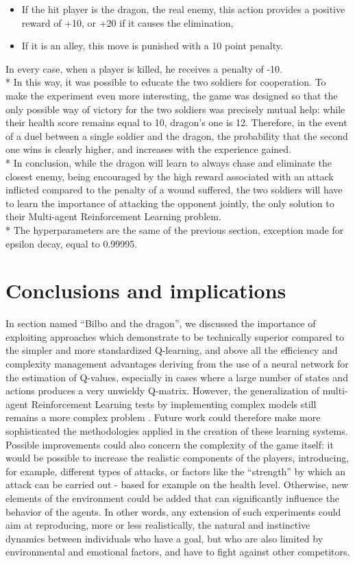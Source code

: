 \begin{itemize}[noitemsep, topsep=0ex]
  \item If the hit player is the dragon, the real enemy, this action provides a positive reward of +10, or +20 if it causes the elimination,
  \item If it is an alley, this move is punished with a 10 point penalty.
\end{itemize}
In every case, when a player is killed, he receives a penalty of -10.\\*
In this way, it was possible to educate the two soldiers for cooperation. To make the experiment even more interesting, the game was designed so that the only possible way of victory for the two soldiers was precisely mutual help: while their health score remains equal to 10, dragon's one is 12. Therefore, in the event of a duel between a single soldier and the dragon, the probability that the second one wins is clearly higher, and increases with the experience gained.\\*
In conclusion, while the dragon will learn to always chase and eliminate the closest enemy, being encouraged by the high reward associated with an attack inflicted compared to the penalty of a wound suffered, the two soldiers will have to learn the importance of attacking the opponent jointly, the only solution to their Multi-agent Reinforcement Learning problem.\\*
The hyperparameters are the same of the previous section, exception made for epsilon decay, equal to 0.99995.

\section{Conclusions and implications}
In section named ``Bilbo and the dragon'', we discussed the importance of exploiting approaches which demonstrate to be technically superior compared to the simpler and more standardized Q-learning, and above all the efficiency and complexity management advantages deriving from the use of a neural network for the estimation of Q-values, especially in cases where a large number of states and actions produces a very unwieldy Q-matrix. However, the generalization of multi-agent Reinforcement Learning tests by implementing complex models still remains a more complex problem \cite{1}. Future work could therefore make more sophisticated the methodologies applied in the creation of these learning systems.
Possible improvements could also concern the complexity of the game itself: it would be possible to increase the realistic components of the players, introducing, for example, different types of attacks, or factors like the ``strength'' by which an attack can be carried out - based for example on the health level. Otherwise, new elements of the environment could be added that can significantly influence the behavior of the agents.
In other words, any extension of such experiments could aim at reproducing, more or less realistically, the natural and instinctive dynamics between individuals who have a goal, but who are also limited by environmental and emotional factors, and have to fight against other competitors.





